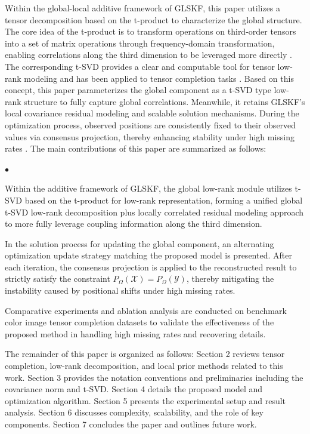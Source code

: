 \documentclass[a4paper,12pt]{article}
\numberwithin{equation}{section}
\numberwithin{algorithm}{section}
\theoremstyle{remark}
\theoremstyle{definition}
\begin{document}
Within the global-local additive framework of GLSKF, this paper utilizes a tensor decomposition based on the t-product to characterize the global structure. The core idea of the t-product is to transform operations on third-order tensors into a set of matrix operations through frequency-domain transformation, enabling correlations along the third dimension to be leveraged more directly \cite{kilmer2011factorization, kilmer2013operators}. The corresponding t-SVD provides a clear and computable tool for tensor low-rank modeling and has been applied to tensor completion tasks \cite{zhang2017tsvd}. Based on this concept, this paper parameterizes the global component as a t-SVD type low-rank structure to fully capture global correlations. Meanwhile, it retains GLSKF's local covariance residual modeling and scalable solution mechanisms. During the optimization process, observed positions are consistently fixed to their observed values via consensus projection, thereby enhancing stability under high missing rates \cite{boyd2011admm}.
The main contributions of this paper are summarized as follows:
	\begin{list}{$\bullet$}
		{\setlength{\parsep}{\parskip}
		\setlength{\itemsep}{0ex plus 0.1ex}
		\setlength{\topsep}{0pt}
	    }
	\item Within the additive framework of GLSKF, the global low-rank module utilizes  t-SVD based on the  t-product for low-rank representation, forming a unified global  t-SVD low-rank decomposition plus locally correlated residual modeling approach to more fully leverage coupling information along the third dimension.
	\item In the solution process for updating the global component, an alternating optimization update strategy matching the proposed model is presented. After each iteration, the consensus projection is applied to the reconstructed result to strictly satisfy the constraint $P_{\Omega}(\mathcal{X})=P_{\Omega}(\mathcal{Y})$, thereby mitigating the instability caused by positional shifts under high missing rates.
	\item Comparative experiments and ablation analysis are conducted on benchmark color image tensor completion datasets to validate the effectiveness of the proposed method in handling high missing rates and recovering details.
\end{list}

The remainder of this paper is organized as follows: Section 2 reviews tensor completion, low-rank decomposition, and local prior methods related to this work. Section 3 provides the notation conventions and preliminaries including the covariance norm and  t-SVD. Section 4 details the proposed model and optimization algorithm. Section 5 presents the experimental setup and result analysis. Section 6 discusses complexity, scalability, and the role of key components. Section 7 concludes the paper and outlines future work.
\end{document}

